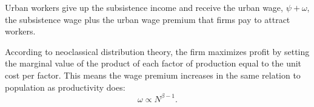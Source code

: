 Urban workers give up the subsistence income and receive the \gls{urban wage}, $\psi +  \omega$, the subsistence wage plus the \gls{urban wage premium} that firms pay to attract workers. 


According to \gls{neoclassical distribution theory}, the firm maximizes profit by setting the marginal value of the product of each \gls{factor of production} equal to the unit cost per factor. This means the wage premium increases in the same relation to population as \gls{productivity} does:
\begin{equation}
\omega\propto N^{\beta-1}.
\label{eqn-wage-population}
\end{equation}



